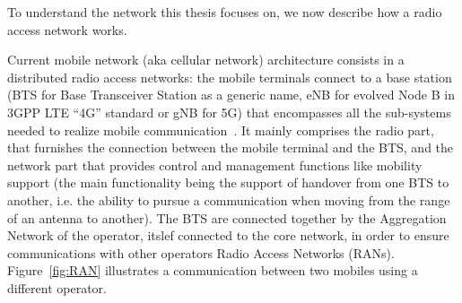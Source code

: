 To understand the network this thesis focuses on, we now describe how a radio access network works.

Current mobile network (aka cellular network) architecture consists in a distributed radio access networks: the mobile terminals connect to a base station (BTS for Base Transceiver Station as a generic name, eNB for evolved Node B in 3GPP LTE “4G” standard or gNB for 5G) that encompasses all the sub-systems needed to realize mobile communication~\cite{bouguen2012lte}. It mainly comprises the radio part, that furnishes the connection between the mobile terminal and the BTS, and the network part that provides control and management functions like mobility support (the main functionality being the support of handover from one BTS to another, i.e. the ability to pursue a communication when moving from the range of an antenna to another).
The BTS are connected together by the Aggregation Network of the operator, itslef connected to the core network, in order to ensure communications with other operators Radio Access Networks (RANs). Figure~\ref{fig:RAN} illustrates a communication between two mobiles using a different operator.

